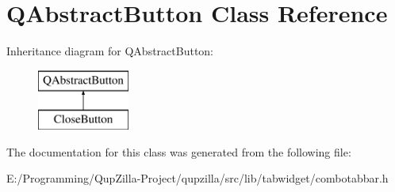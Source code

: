 \hypertarget{class_q_abstract_button}{
\section{QAbstractButton Class Reference}
\label{class_q_abstract_button}
}
Inheritance diagram for QAbstractButton:\begin{figure}[H]
\begin{center}
\leavevmode
\includegraphics[height=2cm]{class_q_abstract_button}
\end{center}
\end{figure}


The documentation for this class was generated from the following file:\begin{DoxyCompactItemize}
\item 
E:/Programming/QupZilla-\/Project/qupzilla/src/lib/tabwidget/combotabbar.h\end{DoxyCompactItemize}
